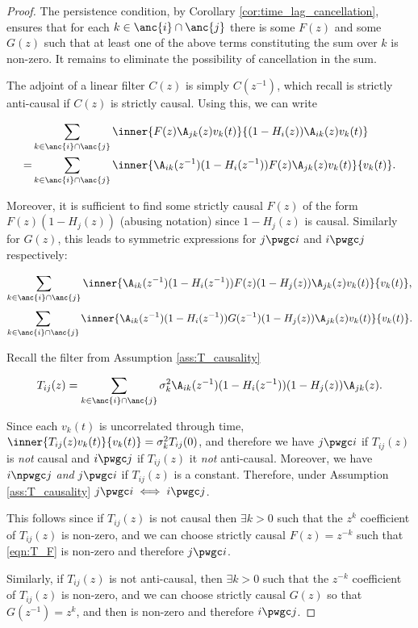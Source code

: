 \begin{proof}
  The persistence condition, by Corollary
  \ref{cor:time_lag_cancellation}, ensures that for each
  $k \in \anc{i}\cap\anc{j}$ there is some $F(z)$ and some $G(z)$ such
  that at least one of the above terms constituting the sum over $k$
  is non-zero.  It remains to eliminate the possibility of
  cancellation in the sum.

  The adjoint of a linear filter $C(z)$ is simply $C(z^{-1})$, which
  recall is strictly anti-causal if $C(z)$ is strictly causal.  Using
  this, we can write

  \begin{align*}
    &\sum_{k \in \anc{i} \cap \anc{j}}\inner{F(z)\A_{jk}(z)v_k(t)}{(1 - H_i(z))\A_{ik}(z)v_k(t)}\\
    = &\sum_{k \in \anc{i} \cap \anc{j}}\inner{\A_{ik}(z^{-1})(1 - H_i(z^{-1}))F(z)\A_{jk}(z)v_k(t)}{v_k(t)}.\\
  \end{align*}

  Moreover, it is sufficient to find some strictly causal $F(z)$ of
  the form $F(z)(1 - H_j(z))$ (abusing notation) since $1 - H_j(z)$ is
  causal.  Similarly for $G(z)$, this leads to symmetric expressions
  for $j \pwgc i$ and $i \pwgc j$ respectively:

  \begin{equation}
    \label{eqn:T_F}
    \sum_{k \in \anc{i} \cap \anc{j}}\inner{\A_{ik}(z^{-1})(1 - H_i(z^{-1}))F(z)(1 - H_j(z))\A_{jk}(z)v_k(t)}{v_k(t)},
  \end{equation}
  \begin{equation}
    \label{eqn:T_G}
    \sum_{k \in \anc{i} \cap \anc{j}}\inner{\A_{ik}(z^{-1})(1 - H_i(z^{-1}))G(z^{-1})(1 - H_j(z))\A_{jk}(z)v_k(t)}{v_k(t)}.
  \end{equation}

  Recall the filter from Assumption \ref{ass:T_causality}

  \begin{equation}
    T_{ij}(z) = \sum_{k \in \anc{i} \cap \anc{j}} \sigma_k^2\A_{ik}(z^{-1})(1 - H_i(z^{-1}))(1 - H_j(z))\A_{jk}(z).
  \end{equation}

  Since each $v_k(t)$ is uncorrelated through time,
  $\inner{T_{ij}(z)v_k(t)}{v_k(t)} = \sigma_k^2T_{ij}(0)$, and
  therefore we have $j \pwgc i$ if $T_{ij}(z)$ is \textit{not} causal
  and $i \pwgc j$ if $T_{ij}(z)$ it \textit{not} anti-causal.
  Moreover, we have $i \npwgc j$ \textit{and} $j \pwgc i$ if
  $T_{ij}(z)$ is a constant.  Therefore, under Assumption
  \ref{ass:T_causality} $j \pwgc i \iff i \pwgc j$.

  This follows since if $T_{ij}(z)$ is not causal then
  $\exists k > 0$ such that the $z^k$ coefficient of $T_{ij}(z)$ is
  non-zero, and we can choose strictly causal $F(z) = z^{-k}$ such
  that \eqref{eqn:T_F} is non-zero and therefore $j \pwgc i$.
  
  Similarly, if $T_{ij}(z)$ is not anti-causal, then
  $\exists k > 0$ such that the $z^{-k}$ coefficient of $T_{ij}(z)$ is
  non-zero, and we can choose strictly causal $G(z)$ so that
  $G(z^{-1}) = z^k$, and then  is non-zero and therefore
  $i \pwgc j$.
\end{proof}

